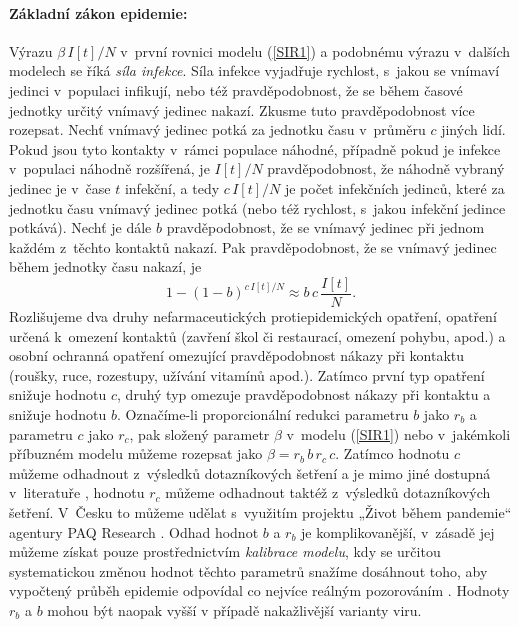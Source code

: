 \paragraph{Základní zákon epidemie:} Výrazu $\beta\,I[t]/N$ v~první rovnici modelu (\ref{SIR1}) a podobnému výrazu v~dalších modelech se říká \emph{síla infekce}. Síla infekce vyjadřuje rychlost, s~jakou se vnímaví jedinci v~populaci infikují, nebo též pravděpodobnost, že se během časové jednotky určitý vnímavý jedinec nakazí. Zkusme tuto pravděpodobnost více rozepsat. Nechť vnímavý jedinec potká za jednotku času v~průměru $c$ jiných lidí. Pokud jsou tyto kontakty v~rámci populace náhodné, případně pokud je infekce v~populaci náhodně rozšířená, je $I[t]/N$ pravděpodobnost, že náhodně vybraný jedinec je v~čase $t$ infekční, a tedy $c\,I[t]/N$ je počet infekčních jedinců, které za jednotku času vnímavý jedinec potká (nebo též rychlost, s~jakou infekční jedince potkává). Nechť je dále $b$ pravděpodobnost, že se vnímavý jedinec při jednom každém z~těchto kontaktů nakazí. Pak pravděpodobnost, že se vnímavý jedinec během jednotky času nakazí, je 
\begin{equation}
1-(1-b)^{c\,I[t]/N} \approx b\, c \, \frac{I[t]}{N}.
\end{equation}
Rozlišujeme dva druhy nefarmaceutických protiepidemických opatření, opatření ur\-če\-ná k~omezení kontaktů (zavření škol či restaurací, omezení pohybu, apod.) a osobní ochranná opatření omezující pravděpodobnost nákazy při kontaktu (roušky, ruce, rozestupy, užívání vitamínů apod.). Zatímco první typ opatření snižuje hodnotu $c$, druhý typ omezuje pravděpodobnost nákazy při kontaktu a snižuje hodnotu $b$. Označíme-li proporcionální redukci parametru $b$ jako $r_b$ a parametru $c$ jako $r_c$, pak složený parametr $\beta$ v~modelu (\ref{SIR1}) nebo v~jakémkoli příbuzném modelu můžeme rozepsat jako $\beta = r_b\,b\,r_c\,c$. Zatímco hodnotu $c$ můžeme odhadnout z~výsledků dotazníkových šetření a je mimo jiné dostupná v~literatuře \cite{Prem_etal2017}, hodnotu $r_c$ můžeme odhadnout taktéž z~výsledků dotazníkových šetření. V~Česku to můžeme udělat s~využitím projektu „Život během pandemie“ agentury PAQ Research \cite[\url{www.zivotbehempandemie.cz}]{paqcovid}. Odhad hodnot $b$ a $r_b$ je komplikovanější, v~zásadě jej můžeme získat pouze prostřednictvím \emph{kalibrace modelu}, kdy se určitou systematickou změnou hodnot těchto parametrů snažíme dosáhnout toho, aby vypočtený průběh epidemie odpovídal co nejvíce reálným pozorováním \cite{Yang_etal2014,King_etal2016}. Hodnoty $r_b$ a $b$ mohou být naopak vyšší v případě nakažlivější varianty viru.


